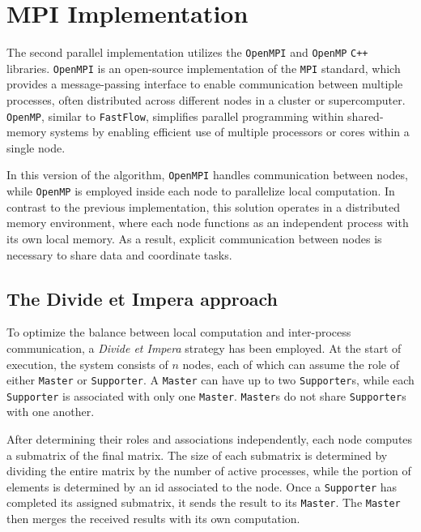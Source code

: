 \section*{MPI Implementation}
The second parallel implementation utilizes the \texttt{OpenMPI} and \texttt{OpenMP} \texttt{C++} libraries. \texttt{OpenMPI} is an open-source implementation of the \texttt{MPI} standard, which provides a message-passing interface to enable communication between multiple processes, often distributed across different nodes in a cluster or supercomputer. \texttt{OpenMP}, similar to \texttt{FastFlow}, simplifies parallel programming within shared-memory systems by enabling efficient use of multiple processors or cores within a single node.

\par In this version of the algorithm, \texttt{OpenMPI} handles communication between nodes, while \texttt{OpenMP} is employed inside each node to parallelize local computation. In contrast to the previous implementation, this solution operates in a distributed memory environment, where each node functions as an independent process with its own local memory. As a result, explicit communication between nodes is necessary to share data and coordinate tasks.

\subsection*{The Divide et Impera approach}

\par To optimize the balance between local computation and inter-process communication, a \textit{Divide et Impera} strategy has been employed. At the start of execution, the system consists of $n$ nodes, each of which can assume the role of either \texttt{Master} or \texttt{Supporter}. A \texttt{Master} can have up to two \texttt{Supporter}s, while each \texttt{Supporter} is associated with only one \texttt{Master}. \texttt{Master}s do not share \texttt{Supporter}s with one another.

After determining their roles and associations independently, each node computes a submatrix of the final matrix. The size of each submatrix is determined by dividing the entire matrix by the number of active processes, while the portion of elements is determined by an id associated to the node. Once a \texttt{Supporter} has completed its assigned submatrix, it sends the result to its \texttt{Master}. The \texttt{Master} then merges the received results with its own computation.

